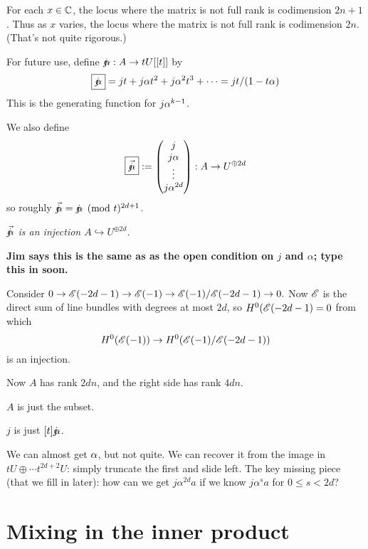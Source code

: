 {For each $x \in \mathbb{C}$, the locus where the matrix is not full rank is codimension $2n+1$.
Thus as $x$ varies, the locus where the matrix is not full rank is codimension $\boxed{\boxed{2n}}$.
(That's not quite rigorous.)


For future use, define $\mathord{j\mkern-7mu\alpha}: A \rightarrow t U[[t]]$ by
$$\boxed{\mathord{j\mkern-7mu\alpha}} = j t + j \alpha  t^2 + j \alpha^2  t^3 + \cdots = jt/(1-t\alpha)$$
This is the generating function for $j \alpha^{k-1}$.

We also define
$$
\boxed{\vec{\mathord{j\mkern-7mu\alpha}}} :=
\begin{pmatrix}
j \\
  j \alpha \\
  \vdots \\
j \alpha^{2d}
\end{pmatrix} : A \rightarrow U^{\oplus 2d}
$$
so roughly $\vec{\mathord{j\mkern-7mu\alpha}} = 
\mathord{j\mkern-7mu\alpha} \pmod t^{2d+1}$.

   {\em $\vec{\mathord{j\mkern-7mu\alpha}}$ is an injection $A \hookrightarrow U^{\oplus 2d}$.
}

{\bf Jim says this is the same as as the open condition on $j$ and $\alpha$; type this in soon.}


Consider $0 \rightarrow {\mathscr{E}}(-2d-1) \rightarrow {\mathscr{E}}(-1) \rightarrow {\mathscr{E}}(-1)/{\mathscr{E}}(-2d-1) \rightarrow 0.$
Now ${\mathscr{E}}$ is the direct sum of line bundles with degrees at most $2d$,
so $H^0({\mathscr{E}}(-2d-1)=0$ from which
$$
H^0({\mathscr{E}}(-1)) \rightarrow H^0({\mathscr{E}}(-1)/ {\mathscr{E}}(-2d-1))$$ is an  injection. \epf

Now $A$ has rank $2dn$, and  the right side has rank $4dn$.


$A$ is just the subset.

$j$ is just $[t] \mathord{j\mkern-7mu\alpha}$.

We can almost get $\alpha$, but not quite. We can recover it from the image in
$tU \oplus \cdots t^{2d+2}U$:  simply truncate the first and slide left.
The key missing piece (that we fill in later):  how can we get $j \alpha^{2d} a$ if we know $j \alpha^s a$ for $0 \leq s < 2d$?


\section{Mixing in the inner product}

}
